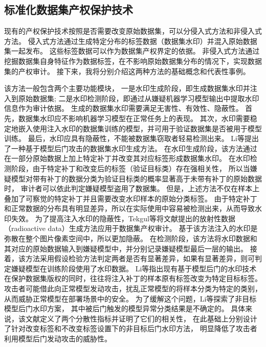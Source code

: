 \subsection{标准化数据集产权保护技术}
现有的产权保护技术按照是否需要改变原始数据集，可以分侵入式方法和非侵入式方法。
侵入式方法通过生成特定分布的标签数据（数据集水印）并混入原始数据集一起发布。
这些标签数据可以作为数据集产权界定的依据。
非侵入式方法通过挖掘数据集自身特征作为数据标签，在不影响原始数据集分布的情况下，实现数据集的产权审计。
接下来，我将分别介绍这两种方法的基础概念和代表性事例。

该方法一般包含两个主要功能模块，
一是水印生成阶段，即生成数据集水印并注入到原始数据集;
二是水印检测阶段，即通过从嫌疑机器学习模型输出中提取水印信息作为审计依据。
生成的数据集水印需要满足无害性、有效性、隐蔽性。
首先，数据集水印应不影响机器学习模型在正常任务上的表现。
其次，水印需要稳定地嵌入使用注入水印的数据集训练的模型，并可用于验证数据集是否被用于模型训练。
最后，水印应具有隐蔽性，不能被数据集窃取者轻易检测出来。
Li等\cite{DBLP:journals/corr/abs-2010-05821}提出了一种基于模型后门攻击\cite{DBLP:journals/corr/abs-1712-05526, DBLP:journals/access/GuLDG19}的数据集水印生成方法。
在水印生成阶段，该方法通过在一部分原始数据上加上特定补丁并改变其对应标签形成数据集水印。
在水印检测阶段，由于特定补丁和改变后的标签（验证目标类）存在强相关性，
所以当嫌疑模型对带有补丁的数据分类为验证目标类的概率显著高于未带有补丁的原始数据时，
审计者可以依此判定嫌疑模型盗用了数据集。
但是，上述方法不仅在样本上叠加了可察觉的特定补丁并且需要改变水印样本的原始分类标签。
由于特定补丁和正常数据的分布具有明显差异，所以在实际使用中容易被检测出来，从而导致水印失效\cite{DBLP:journals/compsec/AikenKWR21, DBLP:conf/sp/WangYSLVZZ19}。
为了提高注入水印的隐蔽性，Tekgul等\cite{DBLP:conf/codaspy/TekgulA22}将文献{\rm\parencite{DBLP:conf/icml/SablayrollesDSJ20}}提出的放射性数据（radioactive data）生成方法应用于数据集产权审计。
基于该方法注入的水印是弥散在整个图片像素空间中，所以更加隐蔽。
在检测阶段，该方法将水印数据和其对应的原始数据输入到嫌疑模型中，并分别记录嫌疑模型最后一层的输出。
接着，该方法采用假设检验方法判定两者是否有显著差异，如果有显著差异，则可判定嫌疑模型在训练阶段使用了水印数据。
Li等\cite{DBLP:journals/corr/abs-2210-00875}指出现有基于模型后门的水印技术在保护数据集版权的同时，往往将注入补丁的样本原有标签改变为特定目标标签。
攻击者可能借此向正常模型发动攻击，扰乱正常模型的将样本分类为特定的类别，从而威胁正常模型在部署场景中的安全。
为了缓解这个问题，Li等\cite{DBLP:journals/corr/abs-2210-00875}探索了非目标模型后门水印方案，
其中被后门触发的模型异常分类结果是不确定的。
具体来说，该文献定义了两个分散性指标并证明了它们的相关性，
在此基础上分别设计了针对改变标签和不改变标签设置下的非目标后门水印方法，
明显降低了攻击者利用模型后门发动攻击的威胁性。


